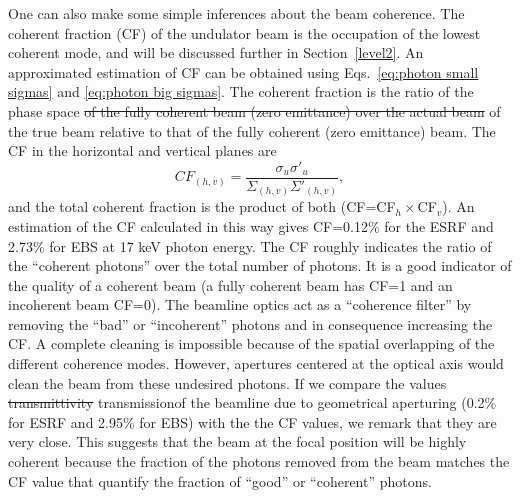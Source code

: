 \documentclass{iucr}              %
\begin{document}
One can also make some simple inferences about the beam coherence. The coherent fraction (CF) \cite{arxivCF} of the undulator beam is the occupation of the lowest coherent mode, and will be discussed further in Section~\ref{level2}. An approximated estimation of CF can be obtained using Eqs.~\ref{eq:photon small sigmas} and \ref{eq:photon big sigmas}. The coherent fraction is the ratio of the phase space {\color{green}\sout{of the fully coherent beam (zero emittance) over the actual beam} of the true beam relative to that of the fully coherent (zero emittance) beam}. The CF in the horizontal and vertical planes are
\begin{equation}\label{eq:coherent fraction}
 CF_{(h,v)} = \frac{\sigma_u \sigma'_u}{\Sigma_{(h,v)} \Sigma'_{(h,v)}},
\end{equation}
and the total coherent fraction is the product of both (CF=CF$_h \times $CF$_v$). An estimation of the CF calculated in this way gives CF=0.12\% for the ESRF and 2.73\% for EBS at 17 keV photon energy. The CF roughly indicates the ratio of the ``coherent photons'' over the total number of photons. It is a good indicator of the quality of a coherent beam (a fully coherent beam has CF=1 and an incoherent beam CF=0). The beamline optics act as a ``coherence filter'' by removing the ``bad'' or ``incoherent'' photons and in consequence increasing the CF. A complete cleaning is impossible because of the spatial overlapping of the different coherence modes. However, apertures centered at the optical axis would clean the beam from these undesired photons. If we compare the values {\color{green}\sout{transmittivity} transmission}of the beamline due to geometrical aperturing  (0.2\% for ESRF and 2.95\% for EBS) with the the CF values, we remark that they are very close. This suggests that the beam at the focal position will be highly coherent because the fraction of the photons removed from the beam matches the CF value that quantify the fraction of ``good'' or ``coherent'' photons. 
\end{document}
